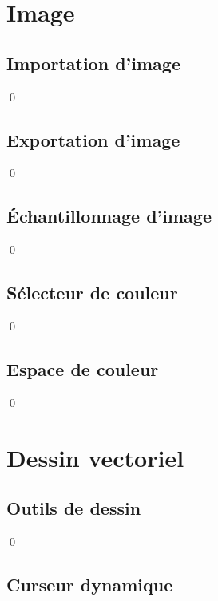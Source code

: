 \documentclass[12pt]{article}
\newcommand{\state}{\noindent}
\begin{document}
\pagebreak

\section{Image}

\subsection{Importation d'image}

\state

\qed

\subsection{Exportation d'image}

\state

\qed

\subsection{Échantillonnage d'image}

\state

\qed

\subsection{Sélecteur de couleur}

\state

\qed

\subsection{Espace de couleur}

\state

\qed

\pagebreak

\section{Dessin vectoriel}

\subsection{Outils de dessin}

\state

\qed

\subsection{Curseur dynamique}
\end{document}
